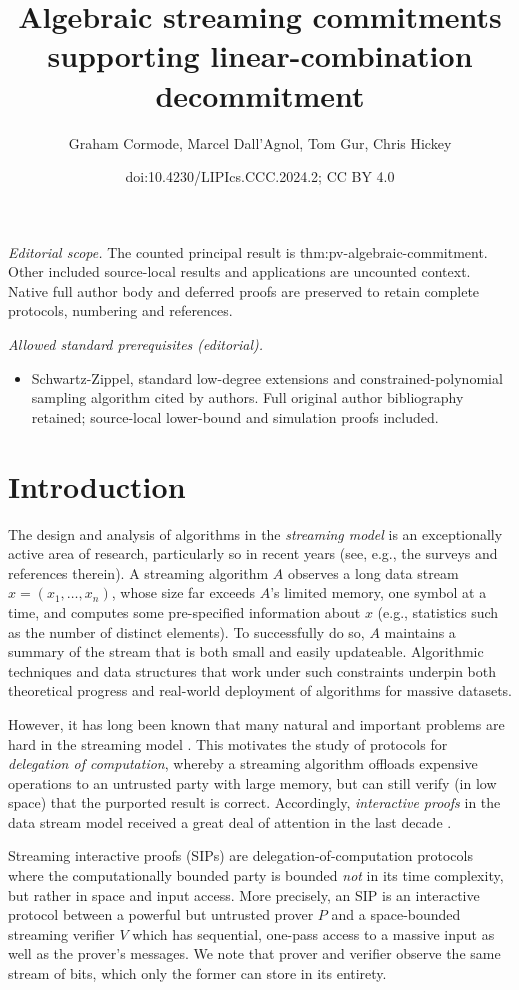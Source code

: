 \documentclass[10pt,a4paper]{article}
\title{Algebraic streaming commitments supporting linear-combination decommitment}
\author{Graham Cormode, Marcel Dall'Agnol, Tom Gur, Chris Hickey}
\date{doi:10.4230/LIPIcs.CCC.2024.2; CC BY 4.0}
\theoremstyle{definition}
\begin{document}
\maketitle
\noindent\textit{Editorial scope.} The counted principal result is thm:pv-algebraic-commitment. Other included source-local results and applications are uncounted context. Native full author body and deferred proofs are preserved to retain complete protocols, numbering and references.\par\medskip
\noindent\textit{Allowed standard prerequisites (editorial).}\begin{itemize}
\item Schwartz-Zippel, standard low-degree extensions and constrained-polynomial sampling algorithm cited by authors. Full original author bibliography retained; source-local lower-bound and simulation proofs included.
\end{itemize}\medskip
\section{Introduction}
\label{sec:intro}

The design and analysis of algorithms in the \emph{streaming model} is an exceptionally active area of research, particularly so in recent years (see, e.g., the surveys \cite{M05, M14, C23} and references therein). A streaming algorithm $A$ observes a long data stream $x = (x_1, \ldots, x_n)$, whose size far exceeds $A$'s limited memory, one symbol at a time, and computes some pre-specified information about $x$ (e.g., statistics such as the number of distinct elements). To successfully do so, $A$ maintains a summary of the stream that is both small and easily updateable. Algorithmic techniques and data structures that work under such constraints underpin both theoretical progress and real-world deployment of algorithms for massive datasets.   

However, it has long been known that many natural and important problems are hard in the streaming model \cite{AMS99}. This motivates the study of protocols for \emph{delegation of computation}, whereby a streaming algorithm offloads expensive operations to an untrusted party with large memory, but can still verify (in low space) that the purported result is correct.  
Accordingly, \emph{interactive proofs} in the data stream model received a great deal of attention in the last decade \cite{CTY11, CMT12, CMT13, T13, CCGT14, T14, CCMTV15, DTV15, CH18, CG19, CGT20}.

Streaming interactive proofs (SIPs) are delegation-of-computation protocols where the computationally bounded party is bounded \emph{not} in its time complexity, but rather in space and input access. More precisely, an SIP is an interactive protocol between a powerful but untrusted prover $P$ and a space-bounded streaming verifier $V$ which has sequential, one-pass access to a massive input as well as the prover's messages. We note that prover and verifier observe the same stream of bits, which only the former can store in its entirety.
\end{document}
